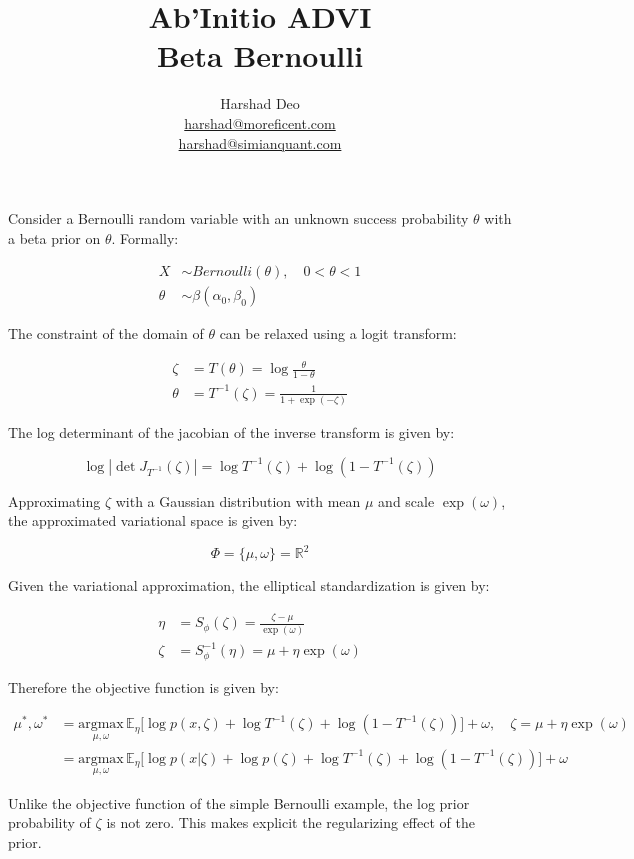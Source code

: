 \documentclass[10pt]{article}
\title{Ab'Initio ADVI \\ Beta Bernoulli}
\author{Harshad Deo \\ 
  \href{mailto:harshad@moreficent.com}{harshad@moreficent.com} \\ 
  \href{mailto:harshad@simianquant.com}{harshad@simianquant.com}
}
\date{}
\begin{document}
  
\maketitle

Consider a Bernoulli random variable with an unknown success probability $\theta$ with a beta prior on $\theta$. Formally:

\begin{align*}
  X &\sim Bernoulli(\theta), \quad 0 < \theta <1\\
  \theta &\sim \beta(\alpha_0, \beta_0)
\end{align*}

The constraint of the domain of $\theta$ can be relaxed using a logit transform:

\begin{align*}
  \zeta &= T(\theta) = \log \frac{\theta}{1 - \theta} \\
  \theta &= T^{-1}(\zeta) = \frac{1}{1 + \exp(-\zeta)}
\end{align*}

The log determinant of the jacobian of the inverse transform is given by:

\begin{equation*}
  \log|\det J_{T^{-1}}(\zeta)| = \log T^{-1}(\zeta) + \log(1 - T^{-1}(\zeta))
\end{equation*}


Approximating $\zeta$ with a Gaussian distribution with mean $\mu$ and scale $\exp(\omega)$, the approximated 
variational space is given by:

\begin{equation*}
  \Phi = \{\mu, \omega\} = \mathbb{R}^2
\end{equation*}

Given the variational approximation, the elliptical standardization is given by:

\begin{align*}
  \eta &= S_{\phi}(\zeta) = \frac{\zeta - \mu}{\exp(\omega)} \\
  \zeta &= S_{\phi}^{-1}(\eta) = \mu + \eta \exp(\omega)
\end{align*}

Therefore the objective function is given by:

\begin{align*}
  \mu^*, \omega^* &= \underset{\mu, \omega}{\text{argmax}}\,\mathbb{E}_\eta\big[\log p(x, \zeta) + \log T^{-1}(\zeta) + \log(1 - T^{-1}(\zeta)) \big] + \omega, \quad \zeta = \mu + \eta\exp(\omega) \\
  &= \underset{\mu, \omega}{\text{argmax}}\,\mathbb{E}_\eta\big[\log p(x | \zeta) + \log p(\zeta) + \log T^{-1}(\zeta) + \log(1 - T^{-1}(\zeta))] + \omega
\end{align*}

Unlike the objective function of the simple Bernoulli example, the log prior probability of $\zeta$ is not zero. This 
makes explicit the regularizing effect of the prior. 
\end{document}
